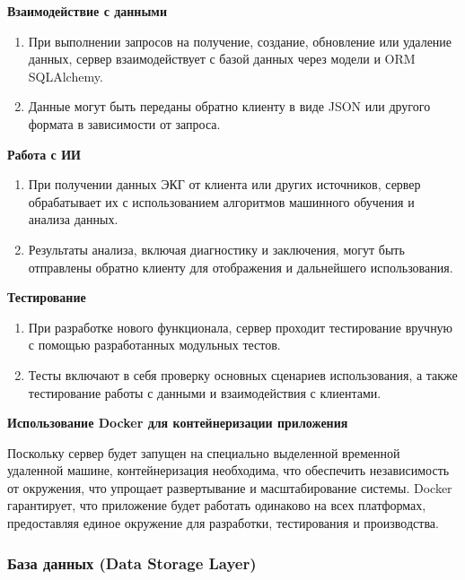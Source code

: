 \documentclass[12pt, russian]{extarticle}
\begin{document}
\begin{spacing}{1.5}
\par \noindent \textbf{Взаимодействие с данными}
\begin{enumerate}
    \item При выполнении запросов на получение, создание, обновление или удаление данных, сервер взаимодействует с базой данных через модели и ORM SQLAlchemy.
    \item Данные могут быть переданы обратно клиенту в виде JSON или другого формата в зависимости от запроса.
\end{enumerate}

\par \noindent \textbf{Работа с ИИ}
\begin{enumerate}
    \item При получении данных ЭКГ от клиента или других источников, сервер обрабатывает их с использованием алгоритмов машинного обучения и анализа данных.
    \item Результаты анализа, включая диагностику и заключения, могут быть отправлены обратно клиенту для отображения и дальнейшего использования.
\end{enumerate}

\par \noindent \textbf{Тестирование}
\begin{enumerate}
    \item При разработке нового функционала, сервер проходит тестирование вручную с помощью разработанных модульных тестов.
    \item Тесты включают в себя проверку основных сценариев использования, а также тестирование работы с данными и взаимодействия с клиентами.
\end{enumerate}

\par \noindent \textbf{Использование Docker для контейнеризации приложения}

Поскольку сервер будет запущен на специально выделенной временной удаленной машине, контейнеризация необходима, что обеспечить независимость от окружения, что упрощает развертывание и масштабирование системы. Docker гарантирует, что приложение будет работать одинаково на всех платформах, предоставляя единое окружение для разработки, тестирования и производства.

\subsubsection{База данных (Data Storage Layer)}


\end{spacing}
\end{document}
